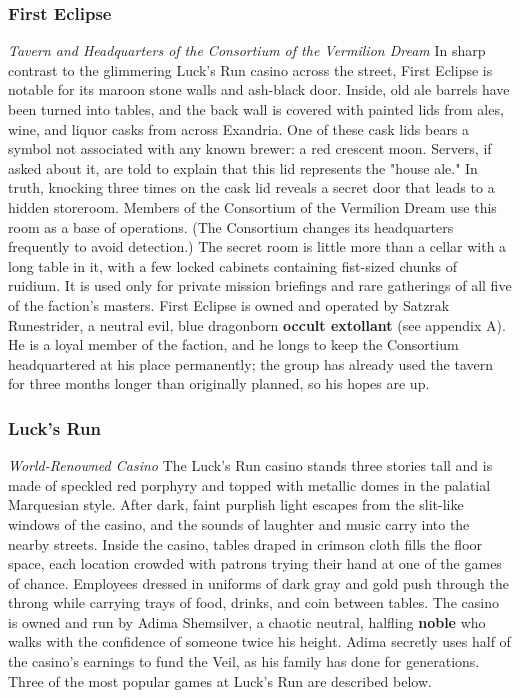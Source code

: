 \documentclass[10pt,a4,twoside,twocolumn,openany,nodeprecatedcode]{dndbook}
\begin{document}
\subsubsection{First Eclipse}
\textit{Tavern and Headquarters of the Consortium of the Vermilion Dream}
In sharp contrast to the glimmering Luck's Run casino across the street, First Eclipse is notable for its maroon stone walls and ash-black door. Inside, old ale barrels have been turned into tables, and the back wall is covered with painted lids from ales, wine, and liquor casks from across Exandria.
One of these cask lids bears a symbol not associated with any known brewer: a red crescent moon. Servers, if asked about it, are told to explain that this lid represents the "house ale." In truth, knocking three times on the cask lid reveals a secret door that leads to a hidden storeroom. Members of the Consortium of the Vermilion Dream use this room as a base of operations. (The Consortium changes its headquarters frequently to avoid detection.)
The secret room is little more than a cellar with a long table in it, with a few locked cabinets containing fist-sized chunks of ruidium. It is used only for private mission briefings and rare gatherings of all five of the faction's masters.
First Eclipse is owned and operated by Satzrak Runestrider, a neutral evil, blue dragonborn \textbf{occult extollant} (see appendix A). He is a loyal member of the faction, and he longs to keep the Consortium headquartered at his place permanently; the group has already used the tavern for three months longer than originally planned, so his hopes are up.
\subsubsection{Luck's Run}
\textit{World-Renowned Casino}
The Luck's Run casino stands three stories tall and is made of speckled red porphyry and topped with metallic domes in the palatial Marquesian style. After dark, faint purplish light escapes from the slit-like windows of the casino, and the sounds of laughter and music carry into the nearby streets.
Inside the casino, tables draped in crimson cloth fills the floor space, each location crowded with patrons trying their hand at one of the games of chance. Employees dressed in uniforms of dark gray and gold push through the throng while carrying trays of food, drinks, and coin between tables.
The casino is owned and run by Adima Shemsilver, a chaotic neutral, halfling \textbf{noble} who walks with the confidence of someone twice his height. Adima secretly uses half of the casino's earnings to fund the Veil, as his family has done for generations.
Three of the most popular games at Luck's Run are described below.
\end{document}
